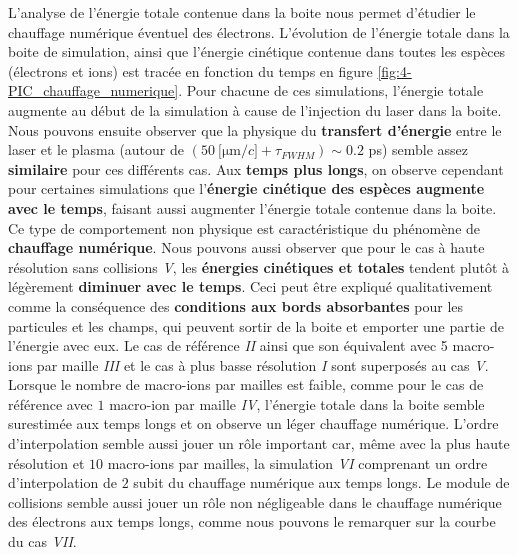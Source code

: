 \begin{refsection}
L'analyse de l'énergie totale contenue dans la boite nous permet d'étudier le chauffage numérique éventuel des électrons. L'évolution de l'énergie totale dans la boite de simulation, ainsi que l'énergie cinétique contenue dans toutes les espèces (électrons et ions) est tracée en fonction du temps en figure \ref{fig:4-PIC_chauffage_numerique}. Pour chacune de ces simulations, l'énergie totale augmente au début de la simulation à cause de l'injection du laser dans la boite. Nous pouvons ensuite observer que la physique du \textbf{transfert d'énergie} entre le laser et le plasma (autour de $(50 ~ \si{[\um/c]} + \tau_{FWHM}) \sim 0.2$ ps) semble assez \textbf{similaire} pour ces différents cas. Aux \textbf{temps plus longs}, on observe cependant pour certaines simulations que l'\textbf{énergie cinétique des espèces augmente avec le temps}, faisant aussi augmenter l'énergie totale contenue dans la boite. Ce type de comportement non physique est caractéristique du phénomène de \textbf{chauffage numérique}.
Nous pouvons aussi observer que pour le cas à haute résolution sans collisions \textit{V}, les \textbf{énergies cinétiques et totales} tendent plutôt à légèrement \textbf{diminuer avec le temps}. Ceci peut être expliqué qualitativement comme la conséquence des \textbf{conditions aux bords absorbantes} pour les particules et les champs, qui peuvent sortir de la boite et emporter une partie de l'énergie avec eux. Le cas de référence \textit{II} ainsi que son équivalent avec 5 macro-ions par maille \textit{III} et le cas à plus basse résolution \textit{I} sont superposés au cas \textit{V}.
Lorsque le nombre de macro-ions par mailles est faible, comme pour le cas de référence avec $1$ macro-ion par maille \textit{IV}, l'énergie totale dans la boite semble surestimée aux temps longs et on observe un léger chauffage numérique. L'ordre d'interpolation semble aussi jouer un rôle important car, même avec la plus haute résolution et $10$ macro-ions par mailles, la simulation \textit{VI} comprenant un ordre d'interpolation de $2$ subit du chauffage numérique aux temps longs. Le module de collisions semble aussi jouer un rôle non négligeable dans le chauffage numérique des électrons aux temps longs, comme nous pouvons le remarquer sur la courbe du cas \textit{VII}. 


\end{refsection}
